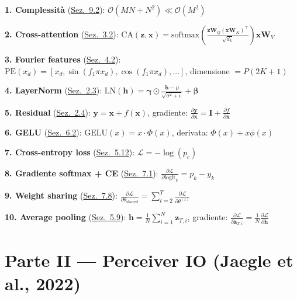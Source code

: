 \documentclass[12pt,a4paper]{article}
\begin{document}
\begin{formulabox}

\textbf{1. Complessit\`a} (\hyperref[sec:compl_perceiver]{Sez.~9.2}): $\mathcal{O}(MN + N^2) \ll \mathcal{O}(M^2)$

\textbf{2. Cross-attention} (\hyperref[sec:cross_attention]{Sez.~3.2}): $\text{CA}(\mathbf{z}, \mathbf{x}) = \text{softmax}\!\left(\frac{\mathbf{z}\mathbf{W}_Q (\mathbf{x}\mathbf{W}_K)^\top}{\sqrt{d_k}}\right) \mathbf{x}\mathbf{W}_V$

\textbf{3. Fourier features} (\hyperref[sec:fourier_encoding]{Sez.~4.2}): $\text{PE}(x_d) = [x_d, \sin(f_1\pi x_d), \cos(f_1\pi x_d), \ldots]$, dimensione $= P(2K+1)$

\textbf{4. LayerNorm} (\hyperref[sec:layernorm]{Sez.~2.3}): $\text{LN}(\mathbf{h}) = \boldsymbol{\gamma} \odot \frac{\mathbf{h} - \mu}{\sqrt{\sigma^2 + \epsilon}} + \boldsymbol{\beta}$

\textbf{5. Residual} (\hyperref[sec:residual]{Sez.~2.4}): $\mathbf{y} = \mathbf{x} + f(\mathbf{x})$, gradiente: $\frac{\partial \mathbf{y}}{\partial \mathbf{x}} = \mathbf{I} + \frac{\partial f}{\partial \mathbf{x}}$

\textbf{6. GELU} (\hyperref[sec:gelu]{Sez.~6.2}): $\text{GELU}(x) = x \cdot \Phi(x)$, derivata: $\Phi(x) + x\phi(x)$

\textbf{7. Cross-entropy loss} (\hyperref[sec:loss]{Sez.~5.12}): $\mathcal{L} = -\log(p_c)$

\textbf{8. Gradiente softmax + CE} (\hyperref[sec:grad_loss]{Sez.~7.1}): $\frac{\partial \mathcal{L}}{\partial \text{logit}_k} = p_k - y_k$

\textbf{9. Weight sharing} (\hyperref[sec:grad_ws]{Sez.~7.8}): $\frac{\partial \mathcal{L}}{\partial \theta_{\text{shared}}} = \sum_{t=2}^{T} \frac{\partial \mathcal{L}}{\partial \theta^{(t)}}$

\textbf{10. Average pooling} (\hyperref[sec:pooling]{Sez.~5.9}): $\mathbf{h} = \frac{1}{N}\sum_{i=1}^{N} \mathbf{z}_{T,i}$, gradiente: $\frac{\partial \mathcal{L}}{\partial \mathbf{z}_{T,i}} = \frac{1}{N} \frac{\partial \mathcal{L}}{\partial \mathbf{h}}$
\end{formulabox}


\newpage
\newpage
\part*{Parte II --- Perceiver IO (Jaegle et al., 2022)}
\end{document}
